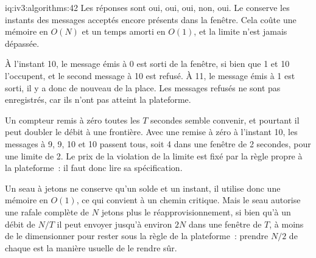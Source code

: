 \begin{solution}{iq:iv3:algorithms:42}
Les réponses sont oui, oui, oui, non, oui. Le  conserve les instants des messages acceptés encore présents dans la fenêtre. Cela coûte une mémoire en $O(N)$ et un temps amorti en $O(1)$, et la limite n'est jamais dépassée.
\enlargethispage{-3\baselineskip}%
\label{lst:iv3:al:ratelimit}

À l'instant 10, le message émis à 0 est sorti de la fenêtre, si bien que 1 et 10 l'occupent, et le second message à 10 est refusé. À 11, le message émis à 1 est sorti, il y a donc de nouveau de la place. Les messages refusés ne sont pas enregistrés, car ils n'ont pas atteint la plateforme.

Un compteur remis à zéro toutes les $T$ secondes semble convenir, et pourtant il peut doubler le débit à une frontière. Avec une remise à zéro à l'instant 10, les messages à 9, 9, 10 et 10 passent tous, soit 4 dans une fenêtre de 2 secondes, pour une limite de 2. Le prix de la violation de la limite est fixé par la règle propre à la plateforme~: il faut donc lire sa spécification.

Un seau à jetons ne conserve qu'un solde et un instant, il utilise donc une mémoire en $O(1)$, ce qui convient à un chemin critique. Mais le seau autorise une rafale complète de $N$ jetons plus le réapprovisionnement, si bien qu'à un débit de $N/T$ il peut envoyer jusqu'à environ $2N$ dans une fenêtre de $T$, à moins de le dimensionner pour rester sous la règle de la plateforme~: prendre $N/2$ de chaque est la manière usuelle de le rendre sûr.

\end{solution}

